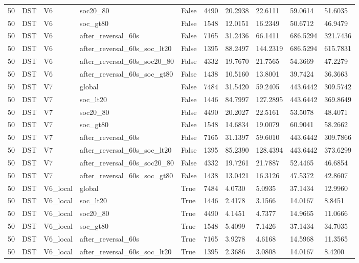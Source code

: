 \begin{tabular}{llllllllll}
50 & DST & V6 & soc20\_80 & False & 4490 & 20.2938 & 22.6111 & 59.0614 & 51.6035 \\
50 & DST & V6 & soc\_gt80 & False & 1548 & 12.0151 & 16.2349 & 50.6712 & 46.9479 \\
50 & DST & V6 & after\_reversal\_60s & False & 7165 & 31.2436 & 66.1411 & 686.5294 & 321.7436 \\
50 & DST & V6 & after\_reversal\_60s\_soc\_lt20 & False & 1395 & 88.2497 & 144.2319 & 686.5294 & 615.7831 \\
50 & DST & V6 & after\_reversal\_60s\_soc20\_80 & False & 4332 & 19.7670 & 21.7565 & 54.3669 & 47.2279 \\
50 & DST & V6 & after\_reversal\_60s\_soc\_gt80 & False & 1438 & 10.5160 & 13.8001 & 39.7424 & 36.3663 \\
50 & DST & V7 & global & False & 7484 & 31.5420 & 59.2405 & 443.6442 & 309.5742 \\
50 & DST & V7 & soc\_lt20 & False & 1446 & 84.7997 & 127.2895 & 443.6442 & 369.8649 \\
50 & DST & V7 & soc20\_80 & False & 4490 & 20.2027 & 22.5161 & 53.5078 & 48.4071 \\
50 & DST & V7 & soc\_gt80 & False & 1548 & 14.6834 & 19.0079 & 60.9041 & 58.2662 \\
50 & DST & V7 & after\_reversal\_60s & False & 7165 & 31.1397 & 59.6010 & 443.6442 & 309.7866 \\
50 & DST & V7 & after\_reversal\_60s\_soc\_lt20 & False & 1395 & 85.2390 & 128.4394 & 443.6442 & 373.6299 \\
50 & DST & V7 & after\_reversal\_60s\_soc20\_80 & False & 4332 & 19.7261 & 21.7887 & 52.4465 & 46.6854 \\
50 & DST & V7 & after\_reversal\_60s\_soc\_gt80 & False & 1438 & 13.0421 & 16.3126 & 47.5372 & 42.8607 \\
50 & DST & V6\_local & global & True & 7484 & 4.0730 & 5.0935 & 37.1434 & 12.9960 \\
50 & DST & V6\_local & soc\_lt20 & True & 1446 & 2.4178 & 3.1566 & 14.0167 & 8.8451 \\
50 & DST & V6\_local & soc20\_80 & True & 4490 & 4.1451 & 4.7377 & 14.9665 & 11.0666 \\
50 & DST & V6\_local & soc\_gt80 & True & 1548 & 5.4099 & 7.1426 & 37.1434 & 34.7035 \\
50 & DST & V6\_local & after\_reversal\_60s & True & 7165 & 3.9278 & 4.6168 & 14.5968 & 11.3565 \\
50 & DST & V6\_local & after\_reversal\_60s\_soc\_lt20 & True & 1395 & 2.3686 & 3.0808 & 14.0167 & 8.4200 \\

\end{tabular}
